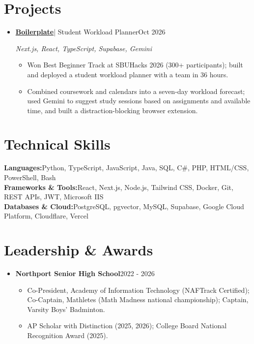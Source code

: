 \documentclass[letterpaper,11pt]{article}
\newcommand{\resumeItem}[1]{
  \item\small{
    {#1}
  }
}
\newcommand{\pdfspace}{\mbox{\textcolor{white}{\char32}}}
\newcommand{\resumeProjectHeading}[2]{
    \item {\small #1\hfill\pdfspace #2}\par\vspace{-2pt}
}
\newcommand{\resumeSubHeadingListStart}{\begin{itemize}[leftmargin=0.15in,label={},topsep=2pt,itemsep=2pt,parsep=0pt]}
\newcommand{\resumeSubHeadingListEnd}{\end{itemize}}
\newcommand{\resumeItemListStart}{\begin{itemize}[topsep=2pt,itemsep=1pt,parsep=0pt]}
\newcommand{\resumeItemListEnd}{\end{itemize}\vspace{-5pt}}
\begin{document}
\section{Projects}
\resumeSubHeadingListStart
  \resumeProjectHeading{\textbf{\href{https://devpost.com/software/boilerplate-3mxhbv}{Boilerplate}}\pdfspace | Student Workload Planner}{Oct 2026}
    {\small\textit{Next.js, React, TypeScript, Supabase, Gemini}\par}\vspace{-5pt}
    \resumeItemListStart
      \resumeItem{Won Best Beginner Track at SBUHacks 2026 (300+ participants); built and deployed a student workload planner with a team in 36 hours.}
      \resumeItem{Combined coursework and calendars into a seven-day workload forecast; used Gemini to suggest study sessions based on assignments and available time, and built a distraction-blocking browser extension.}
    \resumeItemListEnd
\resumeSubHeadingListEnd

\section{Technical Skills}
\begin{itemize}[leftmargin=0.15in,label={},topsep=2pt,itemsep=2pt,parsep=0pt]
  \small{\item{
    \textbf{Languages:}\pdfspace Python, TypeScript, JavaScript, Java, SQL, C\#, PHP, HTML/CSS, PowerShell, Bash \\
    \textbf{Frameworks \& Tools:}\pdfspace React, Next.js, Node.js, Tailwind CSS, Docker, Git, REST APIs, JWT, Microsoft IIS \\
    \textbf{Databases \& Cloud:}\pdfspace PostgreSQL, pgvector, MySQL, Supabase, Google Cloud Platform, Cloudflare, Vercel
  }}
\end{itemize}

\section{Leadership \& Awards}
\resumeSubHeadingListStart
  \resumeProjectHeading{\textbf{Northport Senior High School}}{2022 - 2026}
    \resumeItemListStart
      \resumeItem{Co-President, Academy of Information Technology (NAFTrack Certified); Co-Captain, Mathletes (Math Madness national championship); Captain, Varsity Boys' Badminton.}
      \resumeItem{AP Scholar with Distinction (2025, 2026); College Board National Recognition Award (2025).}
    \resumeItemListEnd
\resumeSubHeadingListEnd
\end{document}
